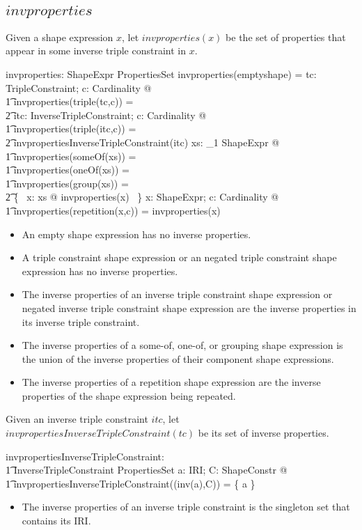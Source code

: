 \documentclass{article}
\begin{document}
\subsection{$invproperties$}

Given a shape expression $x$, let $invproperties(x)$ be the set of properties that appear in some 
inverse triple constraint in $x$.
\begin{axdef}
	invproperties: ShapeExpr \fun PropertiesSet
\where
	invproperties(emptyshape) = \emptyset
\also
	\forall tc: TripleConstraint; c: Cardinality @ \\
\t1		invproperties(triple(tc,c)) = \\
\t2			\emptyset
\also
	\forall itc: InverseTripleConstraint; c: Cardinality @ \\
\t1		invproperties(triple(itc,c)) = \\
\t2			invpropertiesInverseTripleConstraint(itc)
\also
	\forall xs: \seq_1 ShapeExpr @ \\
\t1		invproperties(someOf(xs)) = \\
\t1		invproperties(oneOf(xs)) = \\
\t1		invproperties(group(xs)) = \\
\t2			\bigcup \{~ x: \ran xs @ invproperties(x) ~\}
\also
	\forall x: ShapeExpr; c: Cardinality @ \\
\t1		invproperties(repetition(x,c)) = invproperties(x)
\end{axdef}
\begin{itemize}
\item An empty shape expression has no inverse properties.
\item A triple constraint shape expression or an negated triple constraint
shape expression has no inverse properties.
\item The inverse properties of an inverse triple constraint shape expression or negated inverse triple constraint shape expression
are the inverse properties in its inverse triple constraint.
\item The inverse properties of a some-of, one-of, or grouping shape expression is the union of the inverse properties of their
component shape expressions.
\item The inverse properties of a repetition shape expression are the inverse properties of the shape expression being repeated.
\end{itemize}

Given an inverse triple constraint $itc$, let $invpropertiesInverseTripleConstraint(tc)$ be its set of inverse properties.
\begin{axdef}
	invpropertiesInverseTripleConstraint: \\
\t1		InverseTripleConstraint \fun PropertiesSet
\where
	\forall a: IRI; C: ShapeConstr @ \\
\t1		invpropertiesInverseTripleConstraint((inv(a),C)) = \{ a \}
\end{axdef}
\begin{itemize}
\item The inverse properties of an inverse triple constraint is the singleton set that contains its IRI.
\end{itemize}
\end{document}
